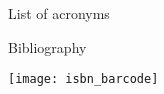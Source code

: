 \documentclass[11pt,fleqn,letterpaper,twoside,openany]{boek3}
\begin{document}
\begin{multicols}{2}
  \printindex
\end{multicols}

 {List of acronyms}

\begin{multicols}{2}
\begin{description}

\end{description}
\end{multicols}

 {Bibliography}





\hbox{}\vfill
\texttt{[image: isbn\_barcode]}

\closeout\chapterlist

\end{document}
